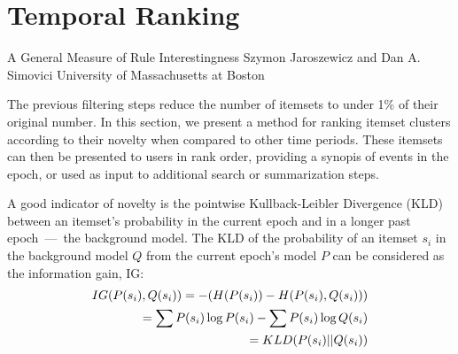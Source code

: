 \documentclass[letterpaper,12pt,titlepage,oneside,final]{book}
\begin{document}
\section{Temporal Ranking}
\label{sec:rank}

A General Measure of Rule Interestingness
Szymon Jaroszewicz and Dan A. Simovici
University of Massachusetts at Boston

The previous filtering steps reduce the number of itemsets to under 1\% of their
original number.
In this section, we present a method for ranking itemset clusters according to
their novelty when compared to other time periods.
These itemsets can then be presented to users in rank order, providing a
synopis of events in the epoch, or used as input to additional search or
summarization steps.

A good indicator of novelty is the pointwise Kullback-Leibler Divergence (KLD)
between an itemset's probability in the current epoch and in a longer past
epoch~---~the background model.
The KLD of the probability of an itemset $s_i$ in the background
model $Q$ from the current epoch's model $P$ can be considered as
the information gain, IG: 
\begin{align}IG(P(s_i),Q(s_i))  = - (H(P(s_i)) - H(P(s_i),Q(s_i))) \notag\\ = \sum{P(s_i) \log{P(s_i)}} - \sum{P(s_i) \log{Q(s_i)}} \notag\\ = KLD(P(s_i)||Q(s_i))\end{align}
\end{document}
